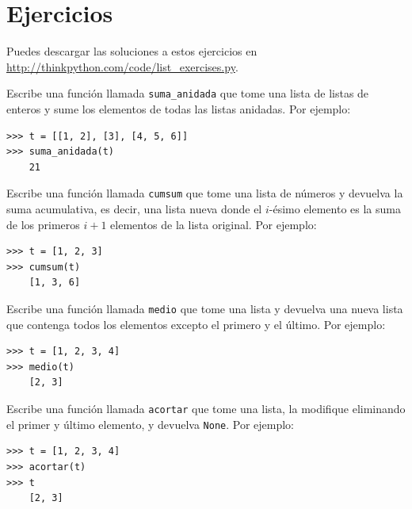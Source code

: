 \documentclass[10pt]{book}
\begin{document}
\section{Ejercicios}

Puedes descargar las soluciones a estos ejercicios en
\url{http://thinkpython.com/code/list_exercises.py}.

\begin{exercise}

Escribe una función llamada \verb"suma_anidada" que tome una lista de listas
de enteros y sume los elementos de todas las listas anidadas.
Por ejemplo:

\begin{verbatim}
>>> t = [[1, 2], [3], [4, 5, 6]]
>>> suma_anidada(t)
    21
\end{verbatim}

\end{exercise}

\begin{exercise}
\label{cumulative}

Escribe una función llamada {\tt cumsum} que tome una lista de números y
devuelva la suma acumulativa, es decir, una lista nueva donde el $i$-ésimo
elemento es la suma de los primeros $i+1$ elementos de la lista original.
Por ejemplo:

\begin{verbatim}
>>> t = [1, 2, 3]
>>> cumsum(t)
    [1, 3, 6]
\end{verbatim}

\end{exercise}

\begin{exercise}

Escribe una función llamada \verb"medio" que tome una lista y
devuelva una nueva lista que contenga todos los elementos excepto el primero
y el último.  Por ejemplo:

\begin{verbatim}
>>> t = [1, 2, 3, 4]
>>> medio(t)
    [2, 3]
\end{verbatim}

\end{exercise}

\begin{exercise}

Escribe una función llamada \verb"acortar" que tome una lista, la modifique
eliminando el primer y último elemento, y devuelva {\tt None}.
Por ejemplo:

\begin{verbatim}
>>> t = [1, 2, 3, 4]
>>> acortar(t)
>>> t
    [2, 3]
\end{verbatim}

\end{exercise}
\end{document}

